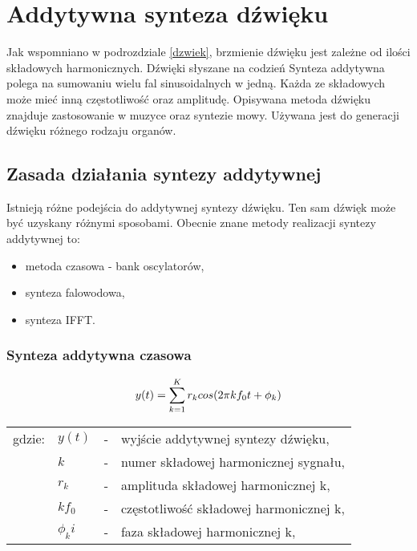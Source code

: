 \chapter{Addytywna synteza dźwięku}\label{chapter_additive}
Jak wspomniano w podrozdziale \ref{dzwiek}, brzmienie dźwięku jest zależne od ilości składowych harmonicznych. Dźwięki słyszane na codzień
Synteza addytywna polega na sumowaniu wielu fal sinusoidalnych w jedną. Każda ze składowych może mieć inną częstotliwość oraz amplitudę.
Opisywana metoda dźwięku znajduje zastosowanie w muzyce oraz syntezie mowy. Używana jest do generacji dźwięku różnego rodzaju organów. 

\section{Zasada działania syntezy addytywnej}
Istnieją różne podejścia do addytywnej syntezy dźwięku. Ten sam dźwięk może być uzyskany różnymi sposobami. Obecnie znane metody realizacji syntezy addytywnej to:
\begin{itemize}
	\item metoda czasowa - bank oscylatorów,
	\item synteza falowodowa,
	\item synteza IFFT.
\end{itemize}

\subsection{Synteza addytywna czasowa}

\begin{equation} \label{equ:addit_time}
y(t) = \sum_{k=1}^{K} r_{k}cos(2\pi kf_{0}t + \phi_{k})  \\  
\end{equation}
\begin{tabular}{ l l l l}
	gdzie: & $y(t)$ &  - & wyjście addytywnej syntezy dźwięku, \\
	&	$k$ & - &  numer składowej harmonicznej sygnału, \\
	&	$r_{k}$ & - &  amplituda składowej harmonicznej k, \\
	&	$kf_{0}$ & - &  częstotliwość składowej harmonicznej k,\\
	&	$\phi_{k}i$ & - &  faza składowej harmonicznej k, \\
\end{tabular}

